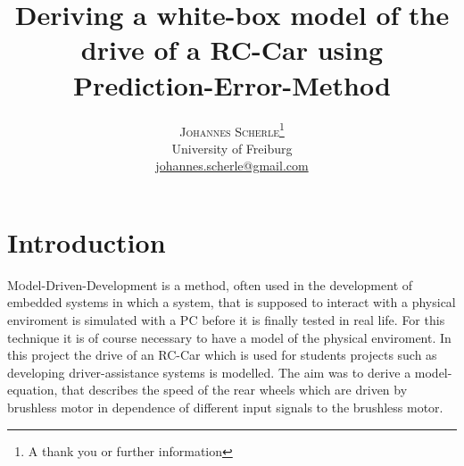 \documentclass[twoside]{article}
\title{\vspace{-15mm}\fontsize{24pt}{10pt}\selectfont\textbf{Deriving a white-box model of the drive of a RC-Car using Prediction-Error-Method}} %
\author{
\large
\textsc{Johannes Scherle}\thanks{A thank you or further information}\\[2mm] %
\normalsize University of Freiburg \\ %
\normalsize \href{mailto:johannes.scherle@gmail.com}{johannes.scherle@gmail.com} %
\vspace{-5mm}
}
\date{}
\begin{document}
\maketitle 

\thispagestyle{fancy} %


%
%
%



\section{Introduction}

\lettrine[nindent=0em,lines=3]{M} odel-Driven-Development is a method, often used in the development of embedded systems in which a system, that is supposed to interact with a physical enviroment is simulated with a PC before it is finally tested in real life. For this technique it is of course necessary to have a model of the physical enviroment. In this project the drive of an RC-Car which is used for students projects such as developing driver-assistance systems is modelled. The aim was to derive a model-equation, that describes the speed of the rear wheels which are driven by brushless motor in dependence of different input signals to the brushless motor.
\end{document}
